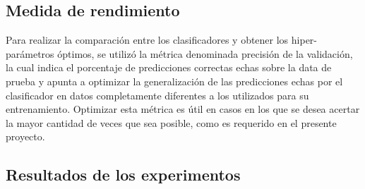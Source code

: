 \documentclass[conference]{IEEEtran}
\begin{document}
        
    
    
    
    
    \subsection{Medida de rendimiento}
    
        Para realizar la comparación entre los clasificadores y obtener los hiper-parámetros óptimos, se utilizó la métrica denominada precisión de la validación, la cual indica el porcentaje de predicciones correctas echas sobre la data de prueba y apunta a optimizar la generalización de las predicciones echas por el clasificador en datos completamente diferentes a los utilizados para su entrenamiento. Optimizar esta métrica es útil en casos en los que se desea acertar la mayor cantidad de veces que sea posible, como es requerido en el presente proyecto.
    
    
    
    
    \subsection{Resultados de los experimentos}
    
\end{document}
